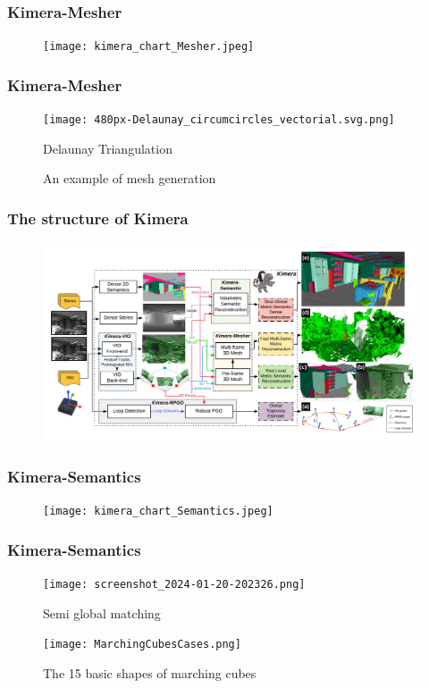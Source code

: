 \documentclass[11pt]{beamer}
\begin{document}
\begin{frame}
\frametitle{Kimera-Mesher}
\begin{figure}
    \texttt{[image: kimera\_chart\_Mesher.jpeg]} 
\end{figure}
\end{frame}
\begin{frame}
\frametitle{Kimera-Mesher}
\begin{minipage}{0.49\textwidth}
    \begin{figure}
        \texttt{[image: 480px-Delaunay\_circumcircles\_vectorial.svg.png]} 
        \caption{Delaunay Triangulation}
    \end{figure}
\end{minipage}
\begin{minipage}{0.49\textwidth}
    \begin{figure}[ht]
        \centering
        \caption{An example of mesh generation}
    \end{figure}
\end{minipage}
\end{frame}
\begin{frame}
\frametitle{The structure of Kimera}
\begin{figure}
    \includegraphics[width=\linewidth]{kimera_chart_23.jpeg} 
\end{figure}
\end{frame}
\begin{frame}
\frametitle{Kimera-Semantics}
\begin{figure}
    \texttt{[image: kimera\_chart\_Semantics.jpeg]} 
\end{figure}
\end{frame}
\begin{frame}
\frametitle{Kimera-Semantics}
\begin{figure}
    \texttt{[image: screenshot\_2024-01-20-202326.png]} 
    \caption{Semi global matching \cite{SGM}}
\end{figure}
\begin{figure}
    \texttt{[image: MarchingCubesCases.png]} 
    \caption{The 15 basic shapes of marching cubes \cite{marchingCubesImage} }
\end{figure}
\end{frame}
\end{document}
